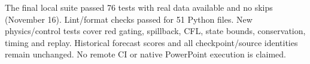 The final local suite passed 76 tests with real data available and no skips (November 16). Lint/format checks passed for 51 Python files. New physics/control tests cover red gating, spillback, CFL, state bounds, conservation, timing and replay. Historical forecast scores and all checkpoint/source identities remain unchanged. No remote CI or native PowerPoint execution is claimed.
